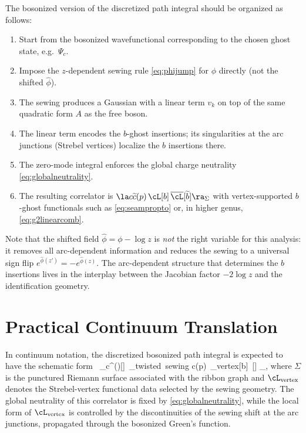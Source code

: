 \documentclass[12pt]{article}
\newcommand{\wt}[1]{\widetilde{#1}}
\newcommand{\ol}[1]{\overline{#1}}
\begin{document}
The bosonized version of the discretized path integral should be organized as follows:
\begin{enumerate}
\item Start from the bosonized wavefunctional corresponding to the chosen ghost state, e.g.\ $\Psi_c$.
\item Impose the $z$-dependent sewing rule \eqref{eq:phijump} for $\phi$ directly (not the shifted $\hat\phi$).
\item The sewing produces a Gaussian with a linear term $v_k$ on top of the same quadratic form $A$ as the free boson.
\item The linear term encodes the $b$-ghost insertions; its singularities at the arc junctions (Strebel vertices) localize the $b$ insertions there.
\item The zero-mode integral enforces the global charge neutrality \eqref{eq:globalneutrality}.
\item The resulting correlator is $\la c\wt c(p)\,\cL[b]\,\ol{\cL}[\wt b]\ra_\Sigma$ with vertex-supported $b$-ghost functionals such as \eqref{eq:seampropto} or, in higher genus, \eqref{eq:g2linearcomb}.
\end{enumerate}

Note that the shifted field $\hat\phi = \phi - \log z$ is \emph{not} the right variable for this analysis: it removes all arc-dependent information and reduces the sewing to a universal sign flip $e^{\hat\phi(z')} = -e^{\hat\phi(z)}$. The arc-dependent structure that determines the $b$ insertions lives in the interplay between the Jacobian factor $-2\log z$ and the identification geometry.

\section{Practical Continuum Translation}

In continuum notation, the discretized bosonized path integral is expected to have the schematic form
\be
\int [D\phi] \,
\Psi_c^{(\phi)}[\phi]\,
\delta_{\rm twisted\ sewing}
\leadsto
\left\langle
c\wt{c}(p)\,
\cL_{\rm vertex}[b]\,
\ol{\cL_{\rm vertex}}[\wt{b}]
\right\rangle_{\Sigma},
\ee
where $\Sigma$ is the punctured Riemann surface associated with the ribbon graph and $\cL_{\rm vertex}$ denotes the Strebel-vertex functional data selected by the sewing geometry. The global neutrality of this correlator is fixed by \eqref{eq:globalneutrality}, while the local form of $\cL_{\rm vertex}$ is controlled by the discontinuities of the sewing shift at the arc junctions, propagated through the bosonized Green's function.
\end{document}
